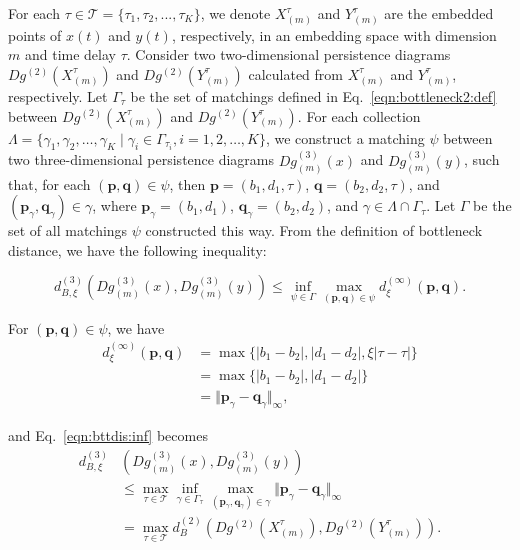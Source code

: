 \documentclass[twocolumn,pre,amsmath,amssymb]{revtex4-1}
\newcommand{\bp}{\ensuremath{\boldsymbol{p}}}
\newcommand{\bq}{\ensuremath{\boldsymbol{q}}}
\newcommand{\dggm}{\ensuremath{Dg_{(m)}^{(3)}}}
\newcommand{\xmt}{\ensuremath{X_{(m)}^\tau}}
\newcommand{\ymt}{\ensuremath{Y_{(m)}^\tau}}
\begin{document}
	For each $\tau \in \mathcal{T}=\{\tau_1,\tau_2,...,\tau_K\}$, we denote $\xmt$ and $\ymt$ are the embedded points of $x(t)$ and $y(t)$, respectively, in an embedding space with dimension $m$ and time delay $\tau$. 
	Consider two two-dimensional persistence diagrams $Dg^{(2)}(\xmt)$ and $Dg^{(2)}(\ymt)$ calculated from $\xmt$ and $\ymt$, respectively. 
	Let $\Gamma_{\tau}$ be the set of matchings defined in Eq.~\eqref{eqn:bottleneck2:def} between $Dg^{(2)}(\xmt)$ and $Dg^{(2)}(\ymt)$. 
	For each collection $\Lambda=\{\gamma_1, \gamma_2, \ldots, \gamma_K  \mid \gamma_i \in \Gamma_{\tau_i}, i=1,2,\ldots, K\}$, we construct a matching $\psi$ between two three-dimensional persistence diagrams $\dggm(x)$ and $\dggm(y)$, such that, 
	for each $(\bp, \bq) \in \psi$, then $\bp=(b_1, d_1, \tau)$, $\bq=(b_2, d_2, \tau)$,
	and $(\bp_{\gamma}, \bq_{\gamma}) \in \gamma$, where $\bp_{\gamma}=(b_1, d_1)$, $\bq_{\gamma}=(b_2, d_2)$, and $\gamma \in \Lambda \cap \Gamma_{\tau}$.
	Let $\Gamma$ be the set of all matchings $\psi$ constructed this way. 
	From the definition of bottleneck distance, we have the following inequality:
	 
	\begin{equation} \label{eqn:bttdis:inf}
		d^{(3)}_{B, \xi}(\dggm(x),\dggm(y)) \leq \inf_{\psi \in \Gamma} \max_{(\bp, \bq) \in \psi} d^{(\infty)}_{\xi}(\bp, \bq).
	\end{equation}
    
	For $(\bp, \bq) \in \psi$, we have
	\begin{align}
			d^{(\infty)}_{\xi}(\bp, \bq) &= \max\{|b_1-b_2|, |d_1-d_2|, \xi|\tau-\tau|\}\\
			 &= \max\{|b_1-b_2|, |d_1-d_2|\}\\
			 &= \Vert \bp_{\gamma} - \bq_{\gamma}\Vert_{\infty},
	\end{align}
	
    and Eq.~\eqref{eqn:bttdis:inf} becomes
	\begin{align} 
		d^{(3)}_{B, \xi}&(\dggm(x),\dggm(y)) \nonumber \\
		& \leq \max_{\tau \in \mathcal{T}} \inf_{\gamma \in \Gamma_{\tau}} \max_{(\bp_{\gamma}, \bq_{\gamma}) \in \gamma} \Vert \bp_{\gamma} - \bq_{\gamma}\Vert_{\infty}\\
	 &= \max_{\tau \in \mathcal{T}} d^{(2)}_B(Dg^{(2)}(\xmt), Dg^{(2)}(\ymt)).\label{eqn:bttdis:2to3}
	\end{align}
	
\end{document}
